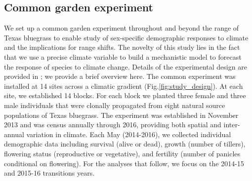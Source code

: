 \documentclass[12pt]{article}
\begin{document}
\subsection*{Common garden experiment}
We set up a common garden experiment throughout and beyond the range of Texas bluegrass to enable study of sex-specific demographic responses to climate and the implications for range shifts. 
The novelty of this study lies in the fact that we use a precise climate variable to build a mechanistic model to forecast the response of species to climate change.
Details of the experimental design are provided in \cite{miller2022two}; we provide a brief overview here. 
The common experiment was installed at 14 sites across a climatic gradient (Fig.\ref{fig:study_design}).
At each site, we established 14 blocks. 
For each block we planted three female and three male individuals that were clonally propagated from eight natural source populations of Texas bluegrass. 
The experiment was established in November 2013 and was census annually through 2016, providing both spatial and inter-annual variation in climate. 
Each May (2014-2016), we collected individual demographic data including survival (alive or dead), growth (number of tillers), flowering status (reproductive or vegetative), and fertility (number of panicles conditional on flowering). 
For the analyses that follow, we focus on the 2014-15 and 2015-16 transitions years.
\end{document}
